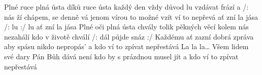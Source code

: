 \begin{TEXT}{Plné ruce plná ústa díků}
\SLOKA {} ruce  ústa  \NL
každý den vždy  důvod  \NL
{}lu vzdávat  frází a  /:  nás\NL
{}ží chápem,  se denně vá \NL
jenom vírou  to možné vzít \NL
{} ví to  nepřevá 
\REFREN  {}    ať zní la jása \NL
/: lu :/     lu ať zní la jása  
\SLOKA Plné oči plná ústa chvály \NL
tolik pěkných věcí kolem nás \NL
nezahálí kdo v životě chválí /: dál půjde snáz :/ \NL
Každému ať zazní dobrá zpráva \NL
aby spásu nikdo nepropás' \NL
a kdo ví to zpívat nepřestává 
\SLOKA La la la… \NL
Všem lidem své dary Pán Bůh dává \NL
není kdo by s prázdnou musel jít \NL
a kdo ví to zpívat nepřestává \NL
\end{TEXT}
